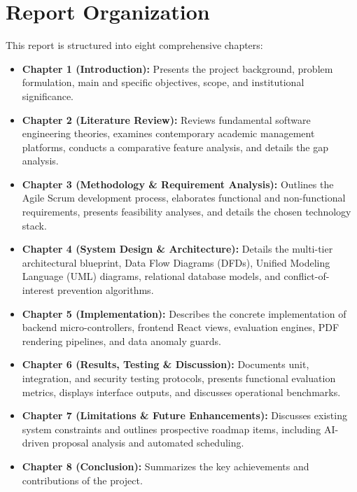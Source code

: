 \section{Report Organization}
This report is structured into eight comprehensive chapters:
\begin{itemize}
    \item \textbf{Chapter 1 (Introduction):} Presents the project background, problem formulation, main and specific objectives, scope, and institutional significance.
    \item \textbf{Chapter 2 (Literature Review):} Reviews fundamental software engineering theories, examines contemporary academic management platforms, conducts a comparative feature analysis, and details the gap analysis.
    \item \textbf{Chapter 3 (Methodology \& Requirement Analysis):} Outlines the Agile Scrum development process, elaborates functional and non-functional requirements, presents feasibility analyses, and details the chosen technology stack.
    \item \textbf{Chapter 4 (System Design \& Architecture):} Details the multi-tier architectural blueprint, Data Flow Diagrams (DFDs), Unified Modeling Language (UML) diagrams, relational database models, and conflict-of-interest prevention algorithms.
    \item \textbf{Chapter 5 (Implementation):} Describes the concrete implementation of backend micro-controllers, frontend React views, evaluation engines, PDF rendering pipelines, and data anomaly guards.
    \item \textbf{Chapter 6 (Results, Testing \& Discussion):} Documents unit, integration, and security testing protocols, presents functional evaluation metrics, displays interface outputs, and discusses operational benchmarks.
    \item \textbf{Chapter 7 (Limitations \& Future Enhancements):} Discusses existing system constraints and outlines prospective roadmap items, including AI-driven proposal analysis and automated scheduling.
    \item \textbf{Chapter 8 (Conclusion):} Summarizes the key achievements and contributions of the project.
\end{itemize}
